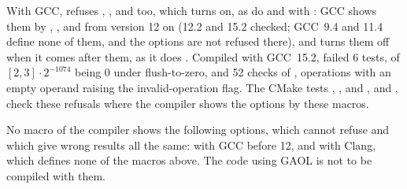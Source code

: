 \medskip
With GCC,  refuses ,
,  and
 too, which 
turns on, as do  and  with
: GCC shows them by ,
,  and
 from version 12 on (12.2 and 15.2 checked; GCC~9.4
and 11.4 define none of them, and the options are not refused there), and
 turns them off when it comes after them, as it does
.\newinvfive{} Compiled with GCC~15.2,
 failed 6 tests,  of
$[2, 3]\cdot2^{-1074}$ being 0 under flush-to-zero, and
 52 checks of ,
operations with an empty operand raising the invalid-operation flag. The CMake
tests , ,
 and , and
, check these refusals where the compiler shows
the options by these macros.

\medskip
No macro of the compiler shows the following options, which
 cannot refuse and which give wrong results all the
same: with GCC before 12, and with Clang, which defines none of the macros
above. The code using GAOL is not to be compiled with them.


